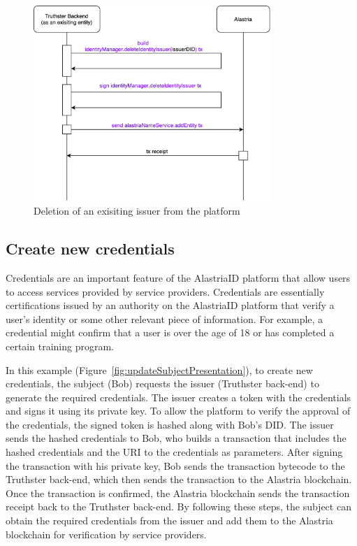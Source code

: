 \documentclass[target=mst,aauheader=]{thud}
\begin{document}
\begin{figure}
    \centering
    \includegraphics[width=0.8\textwidth]{images/deleteExistingIssuer.png}
    \caption{Deletion of an exisiting issuer from the platform}
    \label{fig:deleteIssuer}
\end{figure}

\subsection{Create new credentials}

Credentials are an important feature of the AlastriaID platform that allow users to access services provided by service providers. Credentials are essentially certifications issued by an authority on the AlastriaID platform that verify a user's identity or some other relevant piece of information. For example, a credential might confirm that a user is over the age of 18 or has completed a certain training program.

In this example (Figure~\ref{fig:updateSubjectPresentation}), to create new credentials, the subject (Bob) requests the issuer (Truthster back-end) to generate the required credentials. The issuer creates a token with the credentials and signs it using its private key. To allow the platform to verify the approval of the credentials, the signed token is hashed along with Bob's DID. The issuer sends the hashed credentials to Bob, who builds a transaction that includes the hashed credentials and the URI to the credentials as parameters. After signing the transaction with his private key, Bob sends the transaction bytecode to the Truthster back-end, which then sends the transaction to the Alastria blockchain. Once the transaction is confirmed, the Alastria blockchain sends the transaction receipt back to the Truthster back-end. By following these steps, the subject can obtain the required credentials from the issuer and add them to the Alastria blockchain for verification by service providers.
\end{document}
